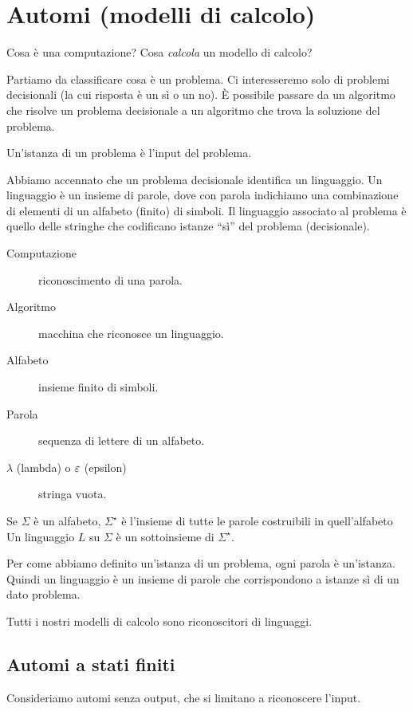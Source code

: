 
\chapter{Automi (modelli di calcolo)}

Cosa \`e una computazione? Cosa \emph{calcola} un modello di calcolo?

Partiamo da classificare cosa \`e un problema.
Ci interesseremo solo di problemi decisionali (la cui risposta \`e un s\`i o un no).
\`E possibile passare da un algoritmo che risolve un problema decisionale a un algoritmo che trova la soluzione del problema.

Un'istanza di un problema \`e l'input del problema.

Abbiamo accennato che un problema decisionale identifica un linguaggio.
Un linguaggio \`e un insieme di parole, dove con parola indichiamo una combinazione di elementi di un alfabeto (finito) di simboli.
Il linguaggio associato al problema \`e quello delle stringhe che codificano istanze ``s\`i'' del problema (decisionale).

\begin{description}
	\item[Computazione] riconoscimento di una parola.
	\item[Algoritmo] macchina che riconosce un linguaggio.
	\item[Alfabeto] insieme finito di simboli.
	\item[Parola] sequenza di lettere di un alfabeto.
	\item[$\lambda$ (lambda) o $\varepsilon$ (epsilon)] stringa vuota.
\end{description}

Se $\Sigma$ \`e un alfabeto, $\Sigma^{\star}$ \`e l'insieme di tutte le parole costruibili in quell'alfabeto
Un linguaggio $L$ su $\Sigma$ \`e un sottoinsieme di $\Sigma^{\star}$.

Per come abbiamo definito un'istanza di un problema, ogni parola \`e un'istanza.
Quindi un linguaggio \`e un insieme di parole che corrispondono a istanze s\`i di un dato problema.

Tutti i nostri modelli di calcolo sono riconoscitori di linguaggi.

\section{Automi a stati finiti}

Consideriamo automi senza output, che si limitano a riconoscere l'input.

